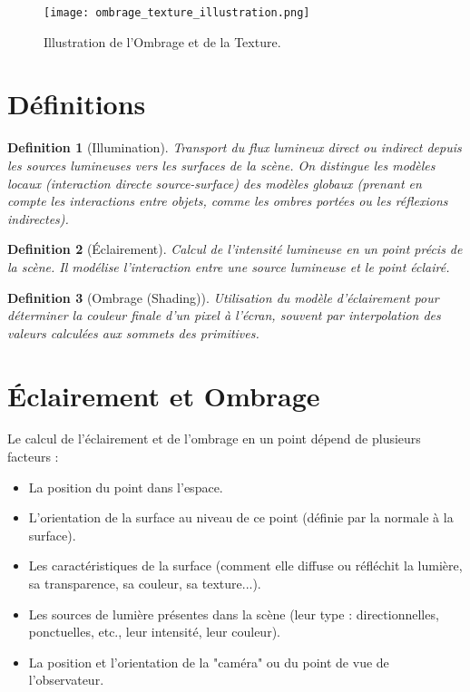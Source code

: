 \documentclass{article}
\newtheorem{definition}{Definition}
\begin{document}
\begin{figure}[H]
\centering
\texttt{[image: ombrage\_texture\_illustration.png]}
\caption{Illustration de l'Ombrage et de la Texture.}
\label{fig:ombrage_texture_illustration}
\end{figure}

\section{Définitions}

\begin{definition}[Illumination]
Transport du flux lumineux direct ou indirect depuis les sources lumineuses vers les surfaces de la scène. On distingue les modèles locaux (interaction directe source-surface) des modèles globaux (prenant en compte les interactions entre objets, comme les ombres portées ou les réflexions indirectes).
\end{definition}

\begin{definition}[Éclairement]
Calcul de l'intensité lumineuse en un point précis de la scène. Il modélise l'interaction entre une source lumineuse et le point éclairé.
\end{definition}

\begin{definition}[Ombrage (Shading)]
Utilisation du modèle d'éclairement pour déterminer la couleur finale d'un pixel à l'écran, souvent par interpolation des valeurs calculées aux sommets des primitives.
\end{definition}

\section{Éclairement et Ombrage}

Le calcul de l'éclairement et de l'ombrage en un point dépend de plusieurs facteurs :
\begin{itemize}
    \item La position du point dans l'espace.
    \item L'orientation de la surface au niveau de ce point (définie par la normale à la surface).
    \item Les caractéristiques de la surface (comment elle diffuse ou réfléchit la lumière, sa transparence, sa couleur, sa texture...).
    \item Les sources de lumière présentes dans la scène (leur type : directionnelles, ponctuelles, etc., leur intensité, leur couleur).
    \item La position et l'orientation de la "caméra" ou du point de vue de l'observateur.
\end{itemize}
\end{document}
